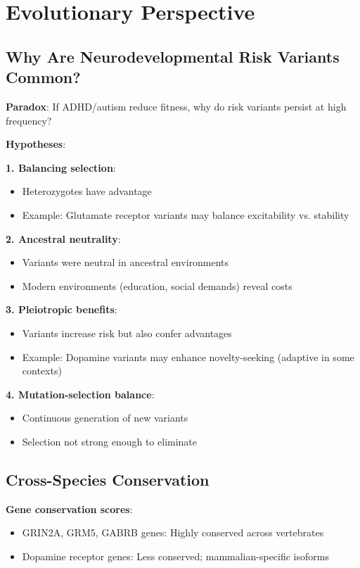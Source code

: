 \documentclass[12pt,letterpaper]{article}
\begin{document}
\section{Evolutionary Perspective}

\subsection{Why Are Neurodevelopmental Risk Variants Common?}

\textbf{Paradox}: If ADHD/autism reduce fitness, why do risk variants persist at high frequency?

\textbf{Hypotheses}:

\textbf{1. Balancing selection}:
\begin{itemize}
    \item Heterozygotes have advantage
    \item Example: Glutamate receptor variants may balance excitability vs. stability
\end{itemize}

\textbf{2. Ancestral neutrality}:
\begin{itemize}
    \item Variants were neutral in ancestral environments
    \item Modern environments (education, social demands) reveal costs
\end{itemize}

\textbf{3. Pleiotropic benefits}:
\begin{itemize}
    \item Variants increase risk but also confer advantages
    \item Example: Dopamine variants may enhance novelty-seeking (adaptive in some contexts)
\end{itemize}

\textbf{4. Mutation-selection balance}:
\begin{itemize}
    \item Continuous generation of new variants
    \item Selection not strong enough to eliminate
\end{itemize}

\subsection{Cross-Species Conservation}

\textbf{Gene conservation scores}:
\begin{itemize}
    \item GRIN2A, GRM5, GABRB genes: Highly conserved across vertebrates
    \item Dopamine receptor genes: Less conserved; mammalian-specific isoforms
\end{itemize}
\end{document}
